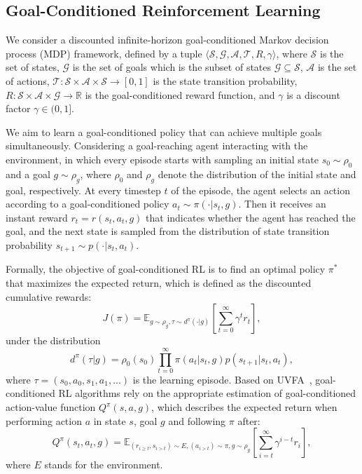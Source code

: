 \documentclass[journal]{IEEEtran}
\begin{document}
\subsection{Goal-Conditioned Reinforcement Learning}
We consider a discounted infinite-horizon goal-conditioned Markov decision process (MDP) framework, defined by a tuple $\langle\mathcal{S}, \mathcal{G}, \mathcal{A}, \mathcal{T}, R, \gamma\rangle$, where $\mathcal{S}$ is the set of states, $\mathcal{G}$ is the set of goals which is the subset of states $\mathcal{G}\subseteq\mathcal{S}$, $\mathcal{A}$ is the set of actions, $\mathcal{T}: \mathcal{S}\times \mathcal{A}\times \mathcal{S}\to [0,1]$ is the state transition probability, $R: \mathcal{S}\times \mathcal{A}\times \mathcal{G} \to\mathbb{R}$ is the goal-conditioned reward function, and $\gamma$ is a discount factor $\gamma\in (0,1]$.

We aim to learn a goal-conditioned policy that can achieve multiple goals simultaneously. Considering a goal-reaching agent interacting with the environment, in which every episode starts with sampling an initial state $s_0\sim \rho_0$ and a goal $g\sim \rho_g$, where $\rho_0$ and $\rho_g$ denote the distribution of the initial state and goal, respectively. At every timestep $t$ of the episode, the agent selects an action according to a goal-conditioned policy $a_t\sim \pi(\cdot|s_t,g)$. Then it receives an instant reward $r_t = r(s_t, a_t, g)$ that indicates whether the agent has reached the goal, and the next state is sampled from the distribution of state transition probability $s_{t+1}\sim p(\cdot|s_t, a_t)$.

Formally, the objective of goal-conditioned RL is to find an optimal policy $\pi^{*}$ that maximizes the expected return, which is defined as the discounted cumulative rewards:
\begin{equation}
    J(\pi) = \mathbb{E}_{g\sim \rho_g, \tau\sim d^{\pi}(\cdot|g)} \left[\sum_{t=0}^{\infty}\gamma^{t}r_{t} \right],
\end{equation}
under the distribution
\begin{equation}
    d^{\pi}(\tau|g) = \rho_0(s_0)\prod_{t=0}^{\infty}\pi(a_t|s_t, g)p(s_{t+1}|s_t,a_t),
\end{equation}
where $\tau = (s_0, a_0, s_1, a_1, ...)$ is the learning episode. Based on UVFA~\citep{schaul2015universal}, goal-conditioned RL algorithms rely on the appropriate estimation of goal-conditioned action-value function $Q^{\pi}(s,a,g)$, which describes the expected return when performing action $a$ in state $s$, goal $g$ and following $\pi$ after:
\begin{equation}
Q^{\pi}(s_t, a_t, g) = \mathbb{E}_{(r_{i\geq t}, s_{i>t})\sim E, (a_{i>t})\sim\pi, g\sim\rho_{g}}\left[\sum_{i=t}^{\infty} \gamma^{i-t}r_i\right],
\end{equation}
where $E$ stands for the environment.
\end{document}
